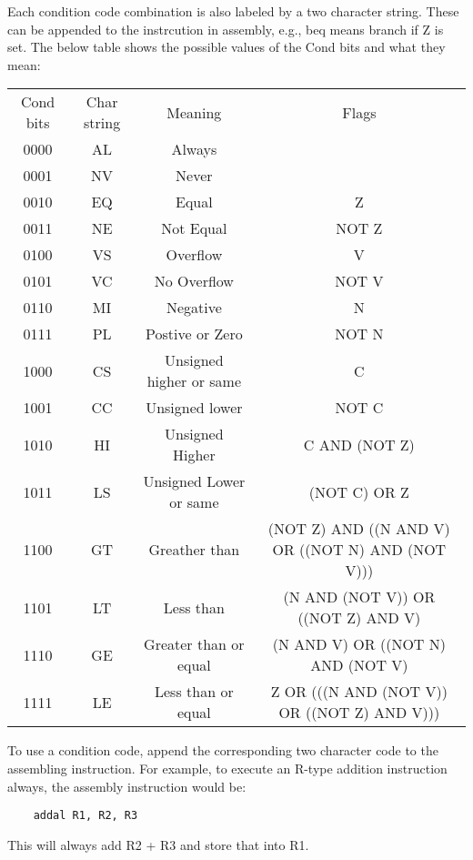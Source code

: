 \documentclass[]{article}
\begin{document}
\noindent Each condition code combination is also labeled by a two character string.  These can be appended to the instrcution in assembly, e.g., beq means branch if Z is set.  The below table shows the possible values of the Cond bits and what they mean:
\begin{center}
	\begin{tabular}{|c|c|c|c|}\cline{1-4}
		Cond bits & Char string & Meaning & Flags\\\cline{1-4}\hfill
		0000 & AL & Always & \\\cline{1-4}\hfill
		0001 & NV & Never & \\\cline{1-4}\hfill
		0010 & EQ & Equal & Z\\\cline{1-4}\hfill
		0011 & NE & Not Equal & NOT Z\\\cline{1-4}\hfill
		0100 & VS & Overflow & V\\\cline{1-4}\hfill
		0101 & VC & No Overflow & NOT V\\\cline{1-4}\hfill
		0110 & MI & Negative & N\\\cline{1-4}\hfill
		0111 & PL & Postive or Zero & NOT N \\\cline{1-4}\hfill
		1000 & CS & Unsigned higher or same &  C\\\cline{1-4}\hfill
		1001 & CC & Unsigned lower & NOT C\\\cline{1-4}\hfill
		1010 & HI & Unsigned Higher & C AND (NOT Z)\\\cline{1-4}\hfill
		1011 & LS & Unsigned Lower or same & (NOT C) OR Z\\\cline{1-4}\hfill
		1100 & GT & Greather than & (NOT Z) AND ((N AND V) OR ((NOT N) AND (NOT V)))\\\cline{1-4}\hfill
		1101 & LT & Less than & (N AND (NOT V)) OR ((NOT Z) AND V)\\\cline{1-4}\hfill
		1110 & GE & Greater than or equal & (N AND V) OR ((NOT N) AND (NOT V)\\\cline{1-4}\hfill
		1111 & LE & Less than or equal & Z OR (((N AND (NOT V)) OR ((NOT Z) AND V)))\\\cline{1-4}
	\end{tabular}
\end{center}

\noindent To use a condition code, append the corresponding two character code to the assembling instruction.  For example, to execute an R-type addition instruction always, the assembly instruction would be:
\begin{lstlisting}
	addal R1, R2, R3
\end{lstlisting}
\noindent This will always add R2 + R3 and store that into R1.
\newline
\end{document}

